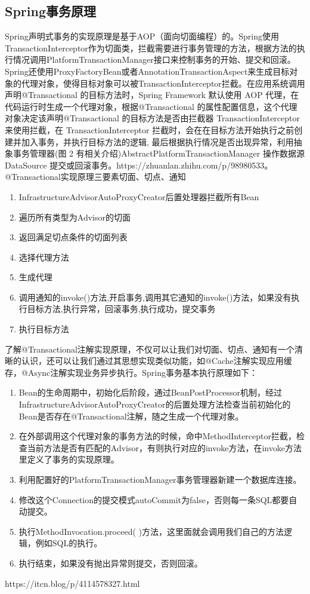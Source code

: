 \documentclass[../../../interview-questions.tex]{subfiles}
\begin{document}
\subsection{Spring事务原理}

Spring声明式事务的实现原理是基于AOP（面向切面编程）的。Spring使用TransactionInterceptor作为切面类，拦截需要进行事务管理的方法，根据方法的执行情况调用PlatformTransactionManager接口来控制事务的开始、提交和回滚。Spring还使用ProxyFactoryBean或者AnnotationTransactionAspect来生成目标对象的代理对象，使得目标对象可以被TransactionInterceptor拦截。在应用系统调用声明@Transactional 的目标方法时，Spring Framework 默认使用 AOP 代理，在代码运行时生成一个代理对象，根据@Transactional 的属性配置信息，这个代理对象决定该声明@Transactional 的目标方法是否由拦截器 TransactionInterceptor 来使用拦截，在 TransactionInterceptor 拦截时，会在在目标方法开始执行之前创建并加入事务，并执行目标方法的逻辑, 最后根据执行情况是否出现异常，利用抽象事务管理器(图 2 有相关介绍)AbstractPlatformTransactionManager 操作数据源 DataSource 提交或回滚事务。https://zhuanlan.zhihu.com/p/98980533。@Transactional实现原理三要素切面、切点、通知

\begin{enumerate}
    \item {InfrastructureAdvisorAutoProxyCreator后置处理器拦截所有Bean}
    \item {遍历所有类型为Advisor的切面}
    \item {返回满足切点条件的切面列表}
    \item {选择代理方法}
    \item {生成代理}
    \item {调用通知的invoke()方法,开启事务,调用其它通知的invoke()方法，如果没有执行目标方法,执行异常，回滚事务,执行成功，提交事务}
    \item {执行目标方法}
\end{enumerate}

了解@Transactional注解实现原理，不仅可以让我们对切面、切点、通知有一个清晰的认识，还可以让我们通过其思想实现类似功能，如@Cache注解实现应用缓存，@Async注解实现业务异步执行。Spring事务基本执行原理如下：

\begin{enumerate}
    \item {Bean的生命周期中，初始化后阶段，通过BeanPostProcessor机制，经过InfrastructureAdvisorAutoProxyCreator的后置处理方法检查当前初始化的Bean是否存在@Transactional注解，随之生成一个代理对象。}
    \item {在外部调用这个代理对象的事务方法的时候，命中MethodInterceptor拦截，检查当前方法是否有匹配的Advisor，有则执行对应的invoke方法，在invoke方法里定义了事务的实现原理。}
    \item {利用配置好的PlatformTransactionManager事务管理器新建一个数据库连接。}
    \item {修改这个Connection的提交模式autoCommit为false，否则每一条SQL都要自动提交。}
    \item {执行MethodInvocation.proceed( )方法，这里面就会调用我们自己的方法逻辑，例如SQL的执行。}
    \item {执行结束，如果没有抛出异常则提交，否则回滚。}
\end{enumerate}

https://itcn.blog/p/4114578327.html
\end{document}
